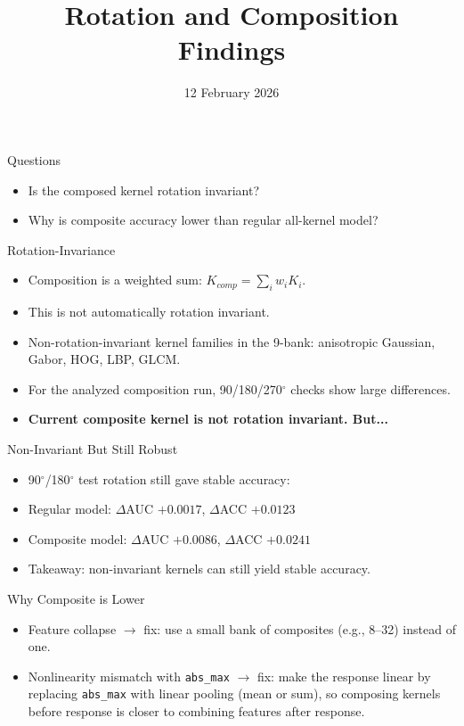 \documentclass[aspectratio=169]{beamer}
\title{Rotation and Composition Findings}
\author{}
\date{12 February 2026}
\begin{document}
\begin{frame}
  \titlepage
\end{frame}

\begin{frame}{Questions}
  \begin{itemize}
    \item Is the composed kernel rotation invariant?
    \item Why is composite accuracy lower than regular all-kernel model?
  \end{itemize}
\end{frame}

\begin{frame}{Rotation-Invariance}
  \begin{itemize}
    \item Composition is a weighted sum: $K_{comp}=\sum_i w_i K_i$.
    \item This is not automatically rotation invariant.
    \item Non-rotation-invariant kernel families in the 9-bank: anisotropic Gaussian, Gabor, HOG, LBP, GLCM.
    \item For the analyzed composition run, 90/180/270$^\circ$ checks show large differences.
    \item \textbf{Current composite kernel is not rotation invariant. But...}
  \end{itemize}
\end{frame}

\begin{frame}{Non-Invariant But Still Robust}
  \begin{itemize}
    \item 90$^\circ$/180$^\circ$ test rotation still gave stable accuracy:
    \item Regular model: $\Delta$AUC $+0.0017$, $\Delta$ACC $+0.0123$
    \item Composite model: $\Delta$AUC $+0.0086$, $\Delta$ACC $+0.0241$
    \item Takeaway: non-invariant kernels can still yield stable accuracy.
  \end{itemize}
\end{frame}

\begin{frame}{Why Composite is Lower}
  \begin{itemize}
    \item Feature collapse $\rightarrow$ fix: use a small bank of composites (e.g., 8--32) instead of one.
    \item Nonlinearity mismatch with \texttt{abs\_max} $\rightarrow$ fix: make the response linear by replacing \texttt{abs\_max} with linear pooling (mean or sum), so composing kernels before response is closer to combining features after response.
  \end{itemize}
\end{frame}
\end{document}
